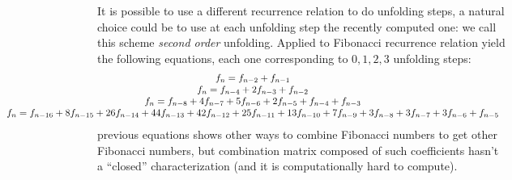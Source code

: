 It is possible to use a different recurrence relation to do 
unfolding steps, a natural choice could be to use at each
unfolding step the recently computed one: we call this scheme
\emph{second order} unfolding. Applied to Fibonacci recurrence
relation yield the following equations, each one corresponding
to $0,1,2,3$ unfolding steps:
\begin{displaymath}
    \hspace{-3.5cm}
    \begin{array}{c}
         f_{n} = f_{n - 2} + f_{n - 1}\\
         f_{n} = f_{n - 4} + 2 f_{n - 3} + f_{n - 2}\\
         f_{n} = f_{n - 8} + 4 f_{n - 7} + 5 f_{n - 6} + 2 f_{n - 5} + f_{n - 4} + f_{n - 3}\\
         f_{n} = f_{n - 16} + 8 f_{n - 15} + 26 f_{n - 14} + 44 f_{n - 13} + 42 f_{n - 12} + 25 f_{n - 11} + 13 f_{n - 10} + 7 f_{n - 9} + 3 f_{n - 8} + 3 f_{n - 7} + 3 f_{n - 6} + f_{n - 5}\\
    \end{array}
\end{displaymath}
previous equations shows other ways to combine Fibonacci numbers
to get other Fibonacci numbers, but combination matrix composed of
such coefficients hasn't a ``closed'' characterization 
(and it is computationally hard to compute).


